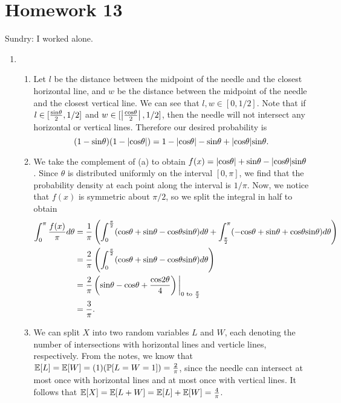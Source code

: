 \section{Homework 13}
Sundry: I worked alone.

\begin{enumerate}
    \item \begin{enumerate}
        \item Let $l$ be the distance between the midpoint of the needle and the closest horizontal line, and $w$ be the distance between the midpoint of the needle and the closest vertical line. We can see that $l, w \in [0, 1/2]$. Note that if $l \in [\frac{\text{sin}\theta}{2}, 1/2]$ and $w \in [\left|\frac{\text{cos}\theta}{2}\right|, 1/2]$, then the needle will not intersect any horizontal or vertical lines. Therefore our desired probability is 
        \[
        (1 - \text{sin}\theta)(1 - |\text{cos}\theta|) = 1 - |\text{cos}\theta| - \text{sin}\theta + |\text{cos}\theta|\text{sin}\theta.
        \]
        
        \item We take the complement of (a) to obtain $f(x) = |\text{cos}\theta| + \text{sin}\theta - |\text{cos}\theta|\text{sin}\theta$. Since $\theta$ is distributed uniformly on the interval $[0, \pi]$, we find that the probability density at each point along the interval is $1/\pi$. Now, we notice that $f(x)$ is symmetric about $\pi/2$, so we split the integral in half to obtain
        \begin{align*}
            \int_0^\pi \frac{f(x)}{\pi}d\theta &= \frac{1}{\pi}\left(\int_0^{\frac{\pi}{2}}(\text{cos}\theta + \text{sin}\theta - \text{cos}\theta\text{sin}\theta)d\theta + \int_{\frac{\pi}{2}}^\pi(-\text{cos}\theta + \text{sin}\theta + \text{cos}\theta\text{sin}\theta)d\theta\right) \\
                &= \frac{2}{\pi}\left(\int_0^{\frac{\pi}{2}}(\text{cos}\theta + \text{sin}\theta - \text{cos}\theta\text{sin}\theta)d\theta\right) \\
                &= \frac{2}{\pi}\left(\text{sin}\theta - \text{cos}\theta + \frac{\text{cos}2\theta}{4}\right)\bigg|_{0 \text{ to } \frac{\pi}{2}} \\
                &= \frac{3}{\pi}.
        \end{align*}
        
        \item We can split $X$ into two random variables $L$ and $W$, each denoting the number of intersections with horizontal lines and verticle lines, respectively. From the notes, we know that $\mathbb{E}[L] = \mathbb{E}[W] = (1)(\mathbb{P}[L = W = 1]) = \frac{2}{\pi}$, since the needle can intersect at most once with horizontal lines and at most once with vertical lines. It follows that $\mathbb{E}[X] = \mathbb{E}[L + W] = \mathbb{E}[L] + \mathbb{E}[W] = \frac{4}{\pi}$.
        

\end{enumerate}
\end{enumerate}
